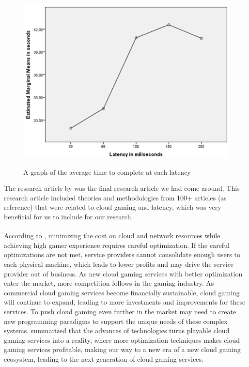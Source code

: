 \begin{figure}[H]
	\centering
	\includegraphics[width=12cm]{../img/fig25.png}
	\caption{A graph of the average time to complete at each latency}
	\parencite[Section 4.1, Page 15, Figure 4.1]{claypool2014effects}
\end{figure}
\newpage
The research article  by \citeauthor{7536162} was the final research article we had come around. This research article included theories and methodologies from 100+ articles (as reference) that were related to cloud gaming and latency, which was very beneficial for us to include for our research.\\\\
According to \textcite[Section VI]{7536162}, minimizing the cost on cloud and network resources while achieving high gamer experience requires careful optimization. If the careful optimizations are not met, service providers cannot consolidate enough users to each physical machine, which leads to lower profits and may drive the service provider out of business. As new cloud gaming services with better optimization enter the market, more competition follows in the gaming industry. As commercial cloud gaming services become financially sustainable, cloud gaming will continue to expand, leading to more investments and improvements for these services. To push cloud gaming even further in the market may need to create new programming paradigms to support the unique needs of these complex systems. \textcite[Section VI]{7536162} summarized that the advances of technologies turns playable cloud gaming services into a reality, where more optimization techniques makes cloud gaming services profitable, making our way to a new era of a new cloud gaming ecosystem, leading to the next generation of cloud gaming services.